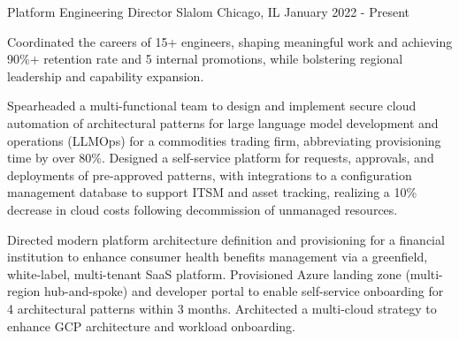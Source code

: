 

\begin{cventries}

  \cventry
    {Platform Engineering Director} %
    {Slalom} %
    {Chicago, IL} %
    {January 2022 - Present} %
    {
      \begin{cvitems} %
        \item {Coordinated the careers of 15+ engineers, shaping meaningful work and achieving 90\%+ retention rate and 5 internal promotions, while bolstering regional leadership and capability expansion.}
        \item {Spearheaded a multi-functional team to design and implement secure cloud automation of architectural patterns for large language model development and operations (LLMOps) for a commodities trading firm, abbreviating provisioning time by over 80\%. Designed a self-service platform for requests, approvals, and deployments of pre-approved patterns, with integrations to a configuration management database to support ITSM and asset tracking, realizing a 10\% decrease in cloud costs following decommission of unmanaged resources.}
        \item {Directed modern platform architecture definition and provisioning for a financial institution to enhance consumer health benefits management via a greenfield, white-label, multi-tenant SaaS platform. Provisioned Azure landing zone (multi-region hub-and-spoke) and developer portal to enable self-service onboarding for 4 architectural patterns within 3 months. Architected a multi-cloud strategy to enhance GCP architecture and workload onboarding.}
      \end{cvitems}
    }


\end{cventries}
